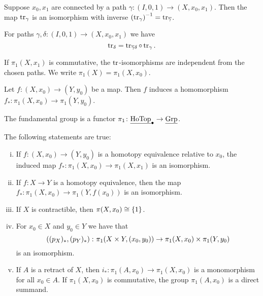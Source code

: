 \begin{trditev}
Suppose $x_0, x_1$ are connected by a path
$\gamma \colon (I, 0, 1) \to (X, x_0, x_1)$. Then the map
$\operatorname{tr}_\gamma$ is an isomorphism with inverse
$\left(\operatorname{tr}_\gamma\right)^{-1} = \operatorname{tr}_{\overline{\gamma}}$.
\end{trditev}

\obvs

\begin{trditev}
For paths $\gamma, \delta \colon (I, 0, 1) \to (X, x_0, x_1)$ we
have
\[
\operatorname{tr}_\delta = \operatorname{tr}_{\overline{\gamma} \delta} \circ \operatorname{tr}_\gamma.
\]
\end{trditev}

\obvs

\begin{opomba}
If $\pi_1(X, x_1)$ is commutative, the $\operatorname{tr}$-isomorphisms are
independent from the chosen paths. We write
$\pi_1(X) = \pi_1(X, x_0)$.
\end{opomba}

\begin{trditev}
Let $f \colon (X, x_0) \to (Y, y_0)$ be a map. Then $f$ induces a
homomorphism $f_* \colon \pi_1(X, x_0) \to \pi_1(Y, y_0)$.
\end{trditev}

\obvs

\begin{trditev}
The fundamental group is a functor
$\pi_1 \colon \underline{\operatorname{HoTop}}_\bullet \to \underline{\operatorname{Grp}}$.
\end{trditev}

\begin{posledica}
The following statements are true:

\begin{enumerate}[i)]
\item If $f \colon (X, x_0) \to (Y, y_0)$ is a homotopy
equivalence relative to $x_0$, the induced map
$f_* \colon \pi_1(X, x_0) \to \pi_1(X, x_1)$ is an isomorphism.
\item If $f \colon X \to Y$ is a homotopy equivalence, then the map
$f_* \colon \pi_1(X, x_0) \to \pi_1(Y, f(x_0))$ is an isomorphism.
\item If $X$ is contractible, then $\pi(X, x_0) \cong \left\{1\right\}$.
\item For $x_0 \in X$ and $y_0 \in Y$ we have that
\[
\left((p_X)_*, (p_Y)_*\right) \colon
\pi_1(X \times Y, (x_0, y_0)) \to
\pi_1(X, x_0) \times \pi_1(Y, y_0)
\]
is an isomorphism.
\item If $A$ is a retract of $X$, then
$i_* \colon \pi_1(A, x_0) \to \pi_1(X, x_0)$ is a monomorphism for
all $x_0 \in A$. If $\pi_1(X, x_0)$ is commutative, the group
$\pi_1(A, x_0)$ is a direct summand.
\end{enumerate}
\end{posledica}

